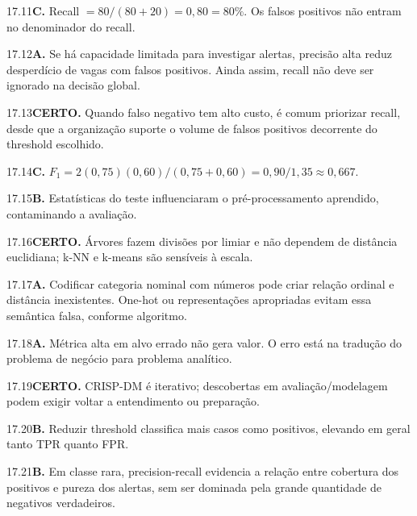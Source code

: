 \begin{solucao}{17.11}\textbf{C.} Recall $=80/(80+20)=0,80=80\%$. Os falsos positivos não entram no denominador do recall.\end{solucao}
\begin{solucao}{17.12}\textbf{A.} Se há capacidade limitada para investigar alertas, precisão alta reduz desperdício de vagas com falsos positivos. Ainda assim, recall não deve ser ignorado na decisão global.\end{solucao}
\begin{solucao}{17.13}\textbf{CERTO.} Quando falso negativo tem alto custo, é comum priorizar recall, desde que a organização suporte o volume de falsos positivos decorrente do threshold escolhido.\end{solucao}
\begin{solucao}{17.14}\textbf{C.} $F_1=2(0,75)(0,60)/(0,75+0,60)=0,90/1,35\approx0,667$.\end{solucao}
\begin{solucao}{17.15}\textbf{B.} Estatísticas do teste influenciaram o pré-processamento aprendido, contaminando a avaliação.\end{solucao}
\begin{solucao}{17.16}\textbf{CERTO.} Árvores fazem divisões por limiar e não dependem de distância euclidiana; k-NN e k-means são sensíveis à escala.\end{solucao}
\begin{solucao}{17.17}\textbf{A.} Codificar categoria nominal com números pode criar relação ordinal e distância inexistentes. One-hot ou representações apropriadas evitam essa semântica falsa, conforme algoritmo.\end{solucao}
\begin{solucao}{17.18}\textbf{A.} Métrica alta em alvo errado não gera valor. O erro está na tradução do problema de negócio para problema analítico.\end{solucao}
\begin{solucao}{17.19}\textbf{CERTO.} CRISP-DM é iterativo; descobertas em avaliação/modelagem podem exigir voltar a entendimento ou preparação.\end{solucao}
\begin{solucao}{17.20}\textbf{B.} Reduzir threshold classifica mais casos como positivos, elevando em geral tanto TPR quanto FPR.\end{solucao}
\begin{solucao}{17.21}\textbf{B.} Em classe rara, precision-recall evidencia a relação entre cobertura dos positivos e pureza dos alertas, sem ser dominada pela grande quantidade de negativos verdadeiros.\end{solucao}
